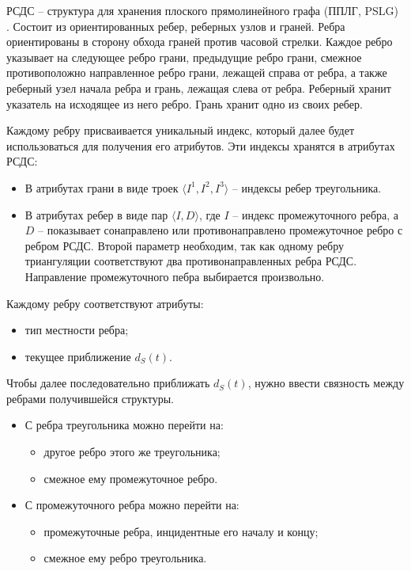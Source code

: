 РСДС -- структура для хранения плоского прямолинейного графа (ППЛГ, PSLG) \cite{PrSh}.
Состоит из ориентированных ребер, реберных узлов и граней. Ребра ориентированы в сторону
обхода граней против часовой стрелки. Каждое ребро
указывает на следующее ребро грани, предыдущие ребро грани, смежное противоположно
направленное ребро грани, лежащей справа от ребра, а также реберный узел начала
ребра и грань, лежащая слева от ребра. Реберный хранит указатель на исходящее
из него ребро. Грань хранит одно из своих ребер.


Каждому ребру присваивается уникальный индекс, который далее
будет использоваться для получения его атрибутов.
Эти индексы хранятся в атрибутах РСДС:
\begin{itemize}
\item В атрибутах грани в виде троек $\langle I^1, I^2, I^3 \rangle$ --
индексы ребер треугольника.
\item В атрибутах ребер  в виде пар $\langle I, D \rangle$, где $I$ --
индекс промежуточного ребра, а $D$ -- показывает сонаправлено или
противонаправлено промежуточное ребро с ребром РСДС. Второй
параметр необходим, так как одному ребру триангуляции соответствуют
два противонаправленных ребра РСДС. Направление промежуточного пебра
выбирается произвольно.
\end{itemize}

Каждому ребру соответствуют атрибуты:
\begin{itemize}
\item тип местности ребра;
\item текущее приближение $d_S(t)$.
\end{itemize}

Чтобы далее последовательно приближать $d_S(t)$, нужно ввести связность между
ребрами получившейся структуры.
\begin{itemize}
\item С ребра треугольника можно перейти на:
  \begin{itemize}
  \item другое ребро этого же треугольника;
  \item смежное ему промежуточное ребро.
  \end{itemize}
\item С промежуточного ребра можно перейти на:
  \begin{itemize}
  \item промежуточные ребра, инцидентные его началу и концу;
  \item смежное ему ребро треугольника.
  \end{itemize}
\end{itemize}

